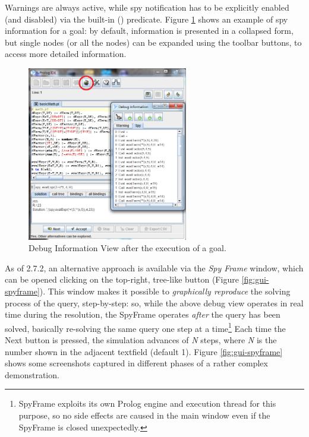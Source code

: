 Warnings are always active, while spy notification has to be explicitly enabled (and disabled) via the built-in  () predicate.
%
Figure \ref{fig:gui-debug} shows an example of spy information for a goal: by default, information is presented in a collapsed form, but single nodes (or all the nodes) can be expanded using the toolbar buttons, to access more detailed information.

\begin{figure}
\centering
\includegraphics[width=7cm]{images/gui-debug}
\caption{Debug Information View after the execution of a goal.}
\label{fig:gui-debug}
\end{figure}

As of \tuprolog{} 2.7.2, an alternative approach is available via the \textit{Spy Frame} window, which can be opened clicking on the top-right, tree-like button (Figure \ref{fig:gui-spyframe}).
This window makes it possible to \textit{graphically reproduce} the solving process of the query, step-by-step: so, while the above debug view operates in real time during the resolution, the SpyFrame operates \textit{after} the query has been solved, basically re-solving the same query one step at a time\footnote{%
    SpyFrame exploits its own Prolog engine and execution thread for this purpose, so no side effects are caused in the main window even if the SpyFrame is closed unexpectedly.}
%
Each time the Next button is pressed, the simulation advances of \textit{N} steps, where \textit{N} is the number shown in the adjacent textfield (default 1).
Figure \ref{fig:gui-spyframe} shows some screenshots captured in different phases of a rather complex demonstration.

